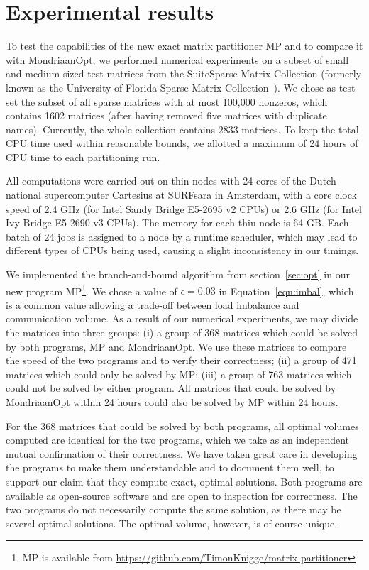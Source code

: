 \section{Experimental results}
\label{sec:experiments}
To test the capabilities of the new exact matrix partitioner MP
and to compare it with MondriaanOpt, we performed numerical experiments
on a subset of small and medium-sized test matrices from the SuiteSparse
Matrix Collection (formerly known as the University
of Florida Sparse Matrix Collection~\cite{davis11}).
We chose as test set the subset of all sparse matrices with at most 100,000 nonzeros,
which contains 1602 matrices (after having removed five matrices with duplicate names).
Currently, the whole collection contains 2833 matrices.
To keep the total CPU time used within reasonable bounds, we allotted
a maximum of 24 hours of CPU time to each partitioning run.

All computations were carried out on thin nodes with 24 cores of the Dutch national supercomputer
Cartesius at  SURFsara in Amsterdam, with a core clock speed of 2.4 GHz (for Intel Sandy Bridge E5-2695 v2  CPUs)
or 2.6 GHz (for Intel Ivy Bridge E5-2690 v3 CPUs). The memory for each 
 thin node is 64 GB. Each batch of 24 jobs is assigned to a node by a runtime scheduler,
which may lead to different types of CPUs being used, causing a slight inconsistency in our timings.

We implemented the branch-and-bound algorithm from section~\ref{sec:opt} in our new program
MP\footnote{MP is available from \url{https://github.com/TimonKnigge/matrix-partitioner}}.
We chose a value of $\epsilon=0.03$ in Equation~\ref{eqn:imbal}, which is a common value
allowing a trade-off between load imbalance and communication volume. 
As a result of our numerical experiments, we may divide the matrices into three groups: (i) a group of 368 matrices which could be solved
by both programs, MP and MondriaanOpt. We use these matrices to compare the speed of the two programs
and to verify their correctness; (ii) a group of 471 matrices which could only be solved by MP;
(iii) a group of 763 matrices which could not be solved by either program.
All matrices that could be solved by MondriaanOpt within 24 hours could also be solved by 
MP within 24 hours.

For the 368 matrices that could be solved by both programs, all optimal volumes computed are identical
for the two programs,
which we take as an independent mutual confirmation of their correctness. We have taken great care
in developing the programs to make them understandable and to document them well,
to support our claim that they compute exact, optimal solutions.
Both programs are available as open-source software
and are open to inspection for correctness.
The two programs do not necessarily compute the same solution, as there may be several
optimal solutions. The optimal volume, however, is of course unique.

